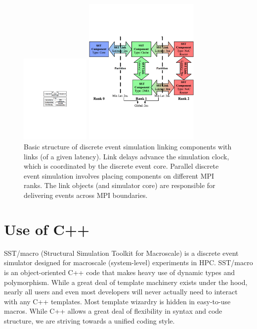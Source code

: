 \begin{figure}
\centering
\includegraphics[width=0.3\textwidth]{figures/desCore}

\includegraphics[width=0.5\textwidth]{figures/pdesCore}
\caption{Basic structure of discrete event simulation linking components with links (of a given latency). Link delays advance the simulation clock, which is coordinated by the discrete event core. Parallel discrete event simulation involves placing components on different MPI ranks. The link objects (and simulator core) are responsible for delivering events across MPI boundaries.}
\label{fig:desCore}
\end{figure}

\section{Use of C++}
SST/macro (Structural Simulation Toolkit for Macroscale) is a discrete event simulator designed for macroscale (system-level) experiments in HPC. 
SST/macro is an object-oriented C++ code that makes heavy use of dynamic types and polymorphism.
While a great deal of template machinery exists under the hood, nearly all users and even most developers will never actually need to interact with any C++ templates.
Most template wizardry is hidden in easy-to-use macros.
While C++ allows a great deal of flexibility in syntax and code structure, we are striving towards a unified coding style.

